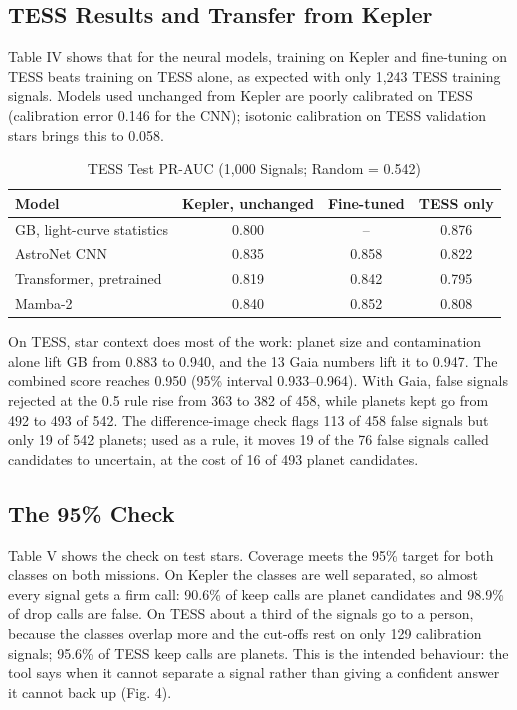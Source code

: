 \documentclass[conference,a4paper]{IEEEtran}
\begin{document}
\subsection{TESS Results and Transfer from Kepler}
Table IV shows that for the neural models, training on Kepler and fine-tuning on TESS beats training on TESS alone, as expected with only 1,243 TESS training signals. Models used unchanged from Kepler are poorly calibrated on TESS (calibration error 0.146 for the CNN); isotonic calibration on TESS validation stars brings this to 0.058.

\begin{table}[!ht]
\caption{TESS Test PR-AUC (1,000 Signals; Random = 0.542)}
\centering\footnotesize\setlength{\tabcolsep}{4pt}
\begin{tabular}{lccc}
\hline
\textbf{Model} & \textbf{Kepler, unchanged} & \textbf{Fine-tuned} & \textbf{TESS only} \\
\hline
GB, light-curve statistics & 0.800 & -- & 0.876 \\
AstroNet CNN & 0.835 & 0.858 & 0.822 \\
Transformer, pretrained & 0.819 & 0.842 & 0.795 \\
Mamba-2 & 0.840 & 0.852 & 0.808 \\
\hline
\end{tabular}
\end{table}
On TESS, star context does most of the work: planet size and contamination alone lift GB from 0.883 to 0.940, and the 13 Gaia numbers lift it to 0.947. The combined score reaches 0.950 (95\% interval 0.933--0.964). With Gaia, false signals rejected at the 0.5 rule rise from 363 to 382 of 458, while planets kept go from 492 to 493 of 542. The difference-image check flags 113 of 458 false signals but only 19 of 542 planets; used as a rule, it moves 19 of the 76 false signals called candidates to uncertain, at the cost of 16 of 493 planet candidates.

\subsection{The 95\% Check}
Table V shows the check on test stars. Coverage meets the 95\% target for both classes on both missions. On Kepler the classes are well separated, so almost every signal gets a firm call: 90.6\% of keep calls are planet candidates and 98.9\% of drop calls are false. On TESS about a third of the signals go to a person, because the classes overlap more and the cut-offs rest on only 129 calibration signals; 95.6\% of TESS keep calls are planets. This is the intended behaviour: the tool says when it cannot separate a signal rather than giving a confident answer it cannot back up (Fig. 4).
\end{document}
